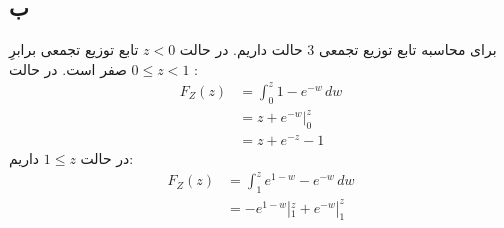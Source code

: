 \subsection*{ب}
برای محاسبه تابع توزیع تجمعی 3 حالت داریم. در حالت
$ z < 0 $
تابع توزیع تجمعی برابرِ صفر است. در حالت
$ 0 \le z < 1 $
:
\begin{align*}
F_Z(z) 
&= \int_{0}^{z} 1 - e^{-w} \, dw \\
&= z + e^{-w}|_{0}^{z} \\
&= z + e^{-z} - 1
\end{align*}
در حالت 
$ 1 \le z $
داریم:
\begin{align*}
F_Z(z)
&= \int_{1}^{z} e^{1 - w} - e^{-w}\, dw \\
&= - e^{1 - w} |_{1}^{z}  + e^{-w} |_{1}^{z} \\
\end{align*}
















































